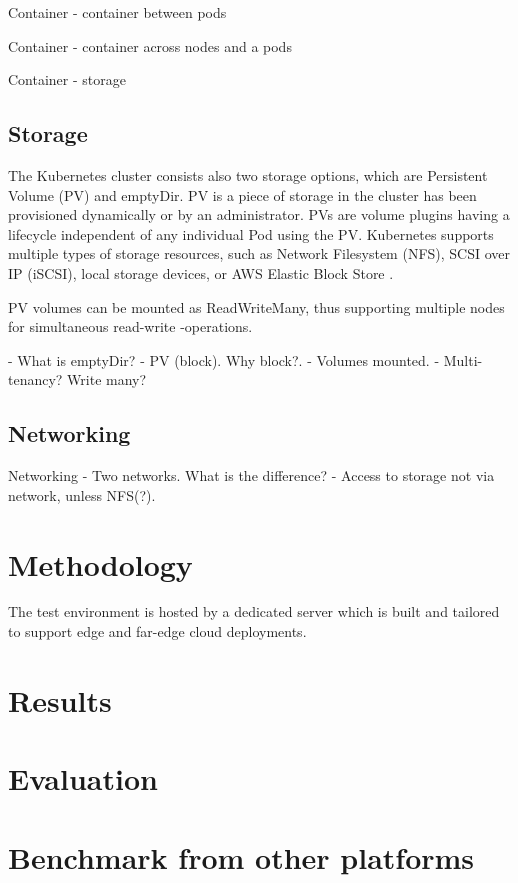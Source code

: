 Container - container between pods

Container - container across nodes and a pods

Container - storage

\subsection{Storage}

The Kubernetes cluster consists also two storage options, which are Persistent Volume (PV) and emptyDir. PV is a piece of storage in the cluster has been provisioned dynamically or by an administrator. PVs are volume plugins having a lifecycle independent of any individual Pod using the PV. Kubernetes supports multiple types of storage resources, such as Network Filesystem (NFS), SCSI over IP (iSCSI), local storage devices, or AWS Elastic Block Store \cite{AmazonEBS}. \cite{PV}

PV volumes can be mounted as ReadWriteMany, thus supporting multiple nodes for simultaneous read-write -operations.

    - What is emptyDir?
    - PV (block). Why block?.
    - Volumes mounted.
    - Multi-tenancy? Write many?

\subsection{Networking}

Networking
    - Two networks. What is the difference?
    - Access to storage not via network, unless NFS(?).













\section{Methodology}

The test environment is hosted by a dedicated server which is built and tailored to support edge and far-edge cloud deployments.


\section{Results}

\section{Evaluation}

\section{Benchmark from other platforms}